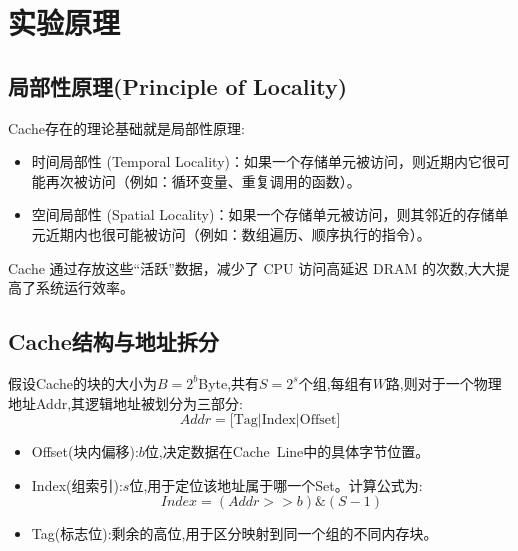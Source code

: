 \section{实验原理}
\subsection{局部性原理(Principle of Locality)}
Cache存在的理论基础就是局部性原理:
\begin{itemize}
    \item 时间局部性 (Temporal Locality)：如果一个存储单元被访问，则近期内它很可能再次被访问（例如：循环变量、重复调用的函数）。
    \item 空间局部性 (Spatial Locality)：如果一个存储单元被访问，则其邻近的存储单元近期内也很可能被访问（例如：数组遍历、顺序执行的指令）。
\end{itemize}
Cache 通过存放这些“活跃”数据，减少了 CPU 访问高延迟 DRAM 的次数,大大提高了系统运行效率。

\subsection{Cache结构与地址拆分}
假设Cache的块的大小为$B = 2^b$Byte,共有$S = 2^s$个组,每组有$W$路,则对于一个物理地址Addr,其逻辑地址被划分为三部分:
\[  Addr = \text{[Tag|Index|Offset]}   \]
\begin{itemize}
    \item Offset(块内偏移):$b$位,决定数据在Cache\ Line中的具体字节位置。
    \item Index(组索引):$s$位,用于定位该地址属于哪一个Set。计算公式为:
    \[  Index = (Addr >> b)\&(S-1) \]
    \item Tag(标志位):剩余的高位,用于区分映射到同一个组的不同内存块。
\end{itemize}

